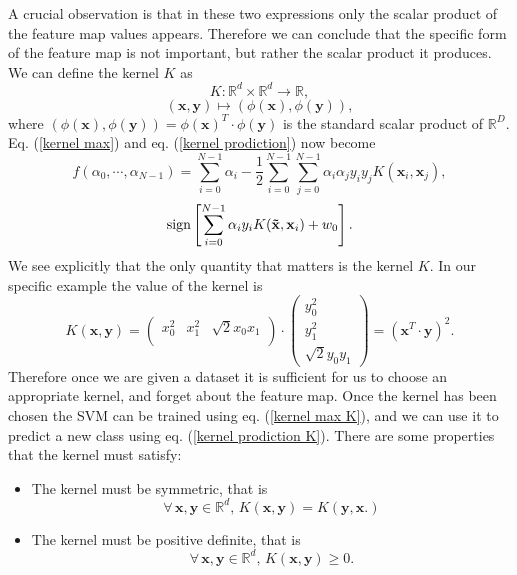 \documentclass[a4paper]{article}
\begin{document}
A crucial observation is that in these two expressions only the scalar product of the feature map values appears. Therefore we can conclude that the specific form of the feature map is not important, but rather the scalar product it produces. We can define the kernel $K$ as 
$$K:\mathbb{R}^d\times \mathbb{R}^d\rightarrow \mathbb{R},$$
\begin{equation}
    (\mathbf{x}, \mathbf{y})\mapsto(\phi(\mathbf{x}), \phi(\mathbf{y})),
\end{equation}
 where $(\phi(\mathbf{x}), \phi(\mathbf{y}))=\phi(\mathbf{x})^T\cdot \phi(\mathbf{y})$ is the standard scalar product of $\mathbb{R}^D$. Eq. (\ref{kernel max}) and eq. (\ref{kernel prodiction}) now become 
 \begin{equation}
    f(\alpha_0,\cdots,\alpha_{N-1})=\sum_{i=0}^{N-1} \alpha_i-\frac{1}{2}\sum_{i=0}^{N-1}\sum_{j=0}^{N-1}\alpha_i\alpha_jy_iy_jK(\mathbf{x}_i,\mathbf{x}_j),
    \label{kernel max K}
\end{equation}
\begin{equation}
    \textup{sign}\left[\sum_{i=0}^{N-1}\alpha_iy_iK(\mathbf{\tilde{x}}, \mathbf{x}_i)+w_0\right].
    \label{kernel prodiction K}
\end{equation}
We see explicitly that the only quantity that matters is the kernel $K$. In our specific example the value of the kernel is 
\begin{equation}
    K(\mathbf{x}, \mathbf{y})= \begin{pmatrix}
        x_0^2 & x_1^2 & \sqrt{2}x_0x_1 \\
        \end{pmatrix}\cdot       \begin{pmatrix}
            y_0^2 \\
            y_1^2\\
            \sqrt{2}y_0y_1
            \end{pmatrix}=(\mathbf{x}^T\cdot\mathbf{y})^2.   
            \label{polykernel ex}   
\end{equation}
Therefore once we are given a dataset it is sufficient for us to choose an appropriate kernel, and forget about the feature map. Once the kernel has been chosen the SVM can be trained using eq. (\ref{kernel max K}), and we can use it to predict a new class using eq. (\ref{kernel prodiction K}). There are some properties that the kernel must satisfy:
\begin{itemize}
    \item The kernel must be symmetric, that is $$\forall\, \mathbf{x},\mathbf{y}\in \mathbb{R}^d,\,K(\mathbf{x},\mathbf{y})=K(\mathbf{y},\mathbf{x}.)$$
    \item The kernel must be positive definite, that is $$\forall\, \mathbf{x},\mathbf{y}\in \mathbb{R}^d,\,K(\mathbf{x},\mathbf{y})\geq 0.$$
\end{itemize}
\end{document}
